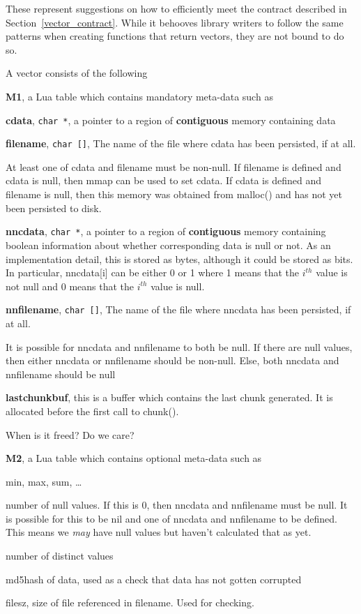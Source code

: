 These represent suggestions on how to efficiently meet the contract described in
Section~\ref{vector_contract}. While it behooves library writers to follow the
same patterns when creating functions that return vectors, they are not bound to
do so.

A vector consists of the following
\be
\item {\bf M1}, a Lua table which contains mandatory meta-data such as 
\be
\item {\bf cdata}, \verb+char *+, a pointer to a region of {\bf contiguous} memory
containing data 
\item {\bf filename}, \verb+char []+, The name of the file where cdata has been
persisted, if at all. 

At least one of cdata and filename must be non-null.
If filename is defined and cdata is null, then mmap can be used to set cdata. If
cdata is defined and filename is null, then this memory was obtained from
malloc()
and has not yet been persisted to disk.
\item {\bf nncdata}, \verb+char *+, a pointer to a region of {\bf contiguous} memory
containing boolean information about whether corresponding data is null or not.
As an implementation detail, this is stored as bytes, although it could be
stored as bits. In particular, nncdata[i] can be either 0 or 1 where 
1 means that the \(i^{th}\) value is not null and 
0 means that the \(i^{th}\) value is null. 

\item {\bf nnfilename}, \verb+char []+, The name of the file where nncdata has been
persisted, if at all. 

It is possible for nncdata and nnfilename to both be null.
If there are null values, then either nncdata or nnfilename should be non-null.  Else, both nncdata and nnfilename should be null
\item {\bf lastchunkbuf}, this is a buffer which contains the last chunk
generated. It is allocated before the first call to chunk(). 

When is it freed? Do we care? 
\ee
\item {\bf M2}, a Lua table which contains optional meta-data such as 
\be
\item min, max, sum, \ldots
\item number of null values. If this is 0, then nncdata and nnfilename must be
null. It is possible for this to be nil and one of nncdata and nnfilename to be
defined. This means we {\em may} have null values but haven't calculated that as
yet. 
\item number of distinct values
\item md5hash of data, used as a check that data has not gotten corrupted
\item filesz, size of file referenced in filename. Used for checking.

